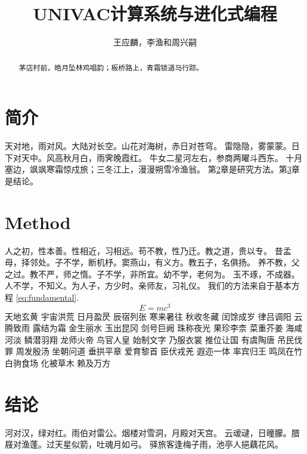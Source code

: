 \documentclass{article}
\title{UNIVAC计算系统与进化式编程}
\author{王应麟，李渔和周兴嗣}
\begin{document}
\maketitle

\begin{abstract}
茅店村前，皓月坠林鸡唱韵；板桥路上，青霜锁道马行踪。
\end{abstract}

\section{简介}

天对地，雨对风。大陆对长空。山花对海树，赤日对苍穹。
雷隐隐，雾蒙蒙。日下对天中。风高秋月白，雨霁晚霞红。
牛女二星河左右，参商两曜斗西东。
十月塞边，飒飒寒霜惊戍旅；三冬江上，漫漫朔雪冷渔翁。 
第\ref{sec:method}章是研究方法。第\ref{sec:conc}章是结论。

\section{Method}
\label{sec:method}

人之初，性本善。性相近，习相远。苟不教，性乃迁。教之道，贵以专。
昔孟母，择邻处。子不学，断机杼。窦燕山，有义方。教五子，名俱扬。
养不教，父之过。教不严，师之惰。子不学，非所宜。幼不学，老何为。
玉不琢，不成器。人不学，不知义。为人子，方少时。亲师友，习礼仪。
我们的方法来自于基本方程 \eqref{eq:fundamental}.
\begin{equation}
E = mc^3 \label{eq:fundamental}
\end{equation}
天地玄黄 宇宙洪荒 日月盈昃 辰宿列张 寒来暑往 秋收冬藏 闰馀成岁 律吕调阳
云腾致雨 露结为霜 金生丽水 玉出昆冈 剑号巨阙 珠称夜光 果珍李柰 菜重芥姜
海咸河淡 鳞潜羽翔 龙师火帝 鸟官人皇 始制文字 乃服衣裳 推位让国 有虞陶唐
吊民伐罪 周发殷汤 坐朝问道 垂拱平章 爱育黎首 臣伏戎羌 遐迩一体 率宾归王
鸣凤在竹 白驹食场 化被草木 赖及万方

\section{结论}
\label{sec:conc}

河对汉，绿对红。雨伯对雷公。烟楼对雪洞，月殿对天宫。
云叆叇，日曈朦。腊屐对渔蓬。过天星似箭，吐魂月如弓。
驿旅客逢梅子雨，池亭人挹藕花风。
\end{document}
